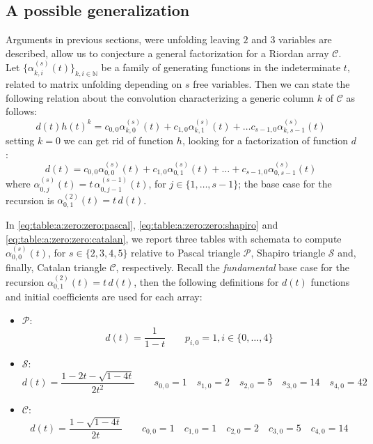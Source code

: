 \subsection{A possible generalization}

Arguments in previous sections, were unfolding leaving $2$ and $3$ variables are
described, allow us to conjecture a general factorization for a Riordan array $\mathcal{C}$.
Let $\lbrace \alpha_{k,i}^{(s)}(t)\rbrace_{k,i\in\mathbb{N}}$ be a family of generating functions
in the indeterminate $t$, related to matrix unfolding depending on $s$ free variables.
Then we can state the following relation about the convolution characterizing a 
generic column $k$ of $\mathcal{C}$ as follows:
\begin{equation}
    d(t)h(t)^{k} = c_{0,0}\alpha_{k,0}^{(s)}(t) + c_{1,0}\alpha_{k,1}^{(s)}(t) + \ldots
        c_{s-1,0}\alpha_{k,s-1}^{(s)}(t)
\end{equation}
setting $k=0$ we can get rid of function $h$, looking for a factorization of function $d$:
\begin{equation}
    d(t) = c_{0,0}\alpha_{0,0}^{(s)}(t) + c_{1,0}\alpha_{0,1}^{(s)}(t) + \ldots +
        c_{s-1,0}\alpha_{0,s-1}^{(s)}(t)
\end{equation}
where $\alpha_{0, j}^{(s)}(t) = t\,\alpha_{0, j-1}^{(s-1)}(t)$, for $j\in\lbrace 1,\ldots,s-1\rbrace$;
the base case for the recursion is $\alpha_{0, 1}^{(2)}(t) = t\,d(t)$.

In \autoref{eq:table:a:zero:zero:pascal}, \autoref{eq:table:a:zero:zero:shapiro} and
\autoref{eq:table:a:zero:zero:catalan}, we report three tables with schemata to compute
$\alpha_{0,0}^{(s)}(t)$, for $s\in\lbrace 2, 3, 4, 5\rbrace$ relative to 
Pascal triangle $\mathcal{P}$, Shapiro triangle $\mathcal{S}$ and, finally,
Catalan triangle $\mathcal{C}$, respectively. Recall the \emph{fundamental}
base case for the recursion $\alpha_{0,1}^{(2)}(t) = t\,d(t)$, then the following 
definitions for $d(t)$ functions and initial coefficients are used for each array: 
\begin{itemize}
\item $\mathcal{P}$:
\begin{displaymath}
     d(t) = \frac{1}{1-t} \quad \quad p_{i,0}=1, i\in\lbrace 0,\ldots,4\rbrace
\end{displaymath}

\item $\mathcal{S}$:
\begin{displaymath}
        d(t) = \frac{1-2t-\sqrt{1-4t}}{2t^{2}} \quad \quad 
            s_{0,0}=1\quad s_{1,0}=2\quad s_{2,0}=5\quad s_{3,0}=14\quad s_{4,0}=42
\end{displaymath}

\item $\mathcal{C}$:
\begin{displaymath}
        d(t) = \frac{1-\sqrt{1-4t}}{2t} \quad \quad 
            c_{0,0}=1\quad c_{1,0}=1\quad c_{2,0}=2\quad c_{3,0}=5\quad c_{4,0}=14
\end{displaymath}

\end{itemize}

